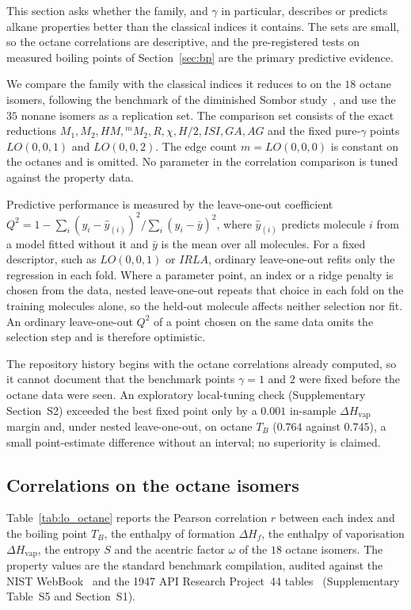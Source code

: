 \documentclass[a5paper, 10pt]{article}
\theoremstyle{plain}
\theoremstyle{remark}
\theoremstyle{definition}
\begin{document}
This section asks whether the family, and $\gamma$ in particular,
describes or predicts alkane properties better than the classical
indices it contains. The sets are small, so the octane
correlations are descriptive, and the pre-registered tests on measured
boiling points of Section~\ref{sec:bp} are the primary predictive
evidence.

We compare the family with the classical indices it reduces to on the
$18$ octane isomers, following the benchmark of the diminished Sombor
study~\cite{MovahediGutmanRedzepovicFurtula2026}, and use the $35$
nonane isomers as a replication set. The comparison set consists of
the exact reductions $M_1, M_2, HM, {}^{m}\!M_2, R, \chi, H/2, ISI, GA,
AG$ and the fixed pure-$\gamma$ points $LO(0, 0, 1)$ and $LO(0, 0, 2)$.
The edge count $m = LO(0, 0, 0)$ is constant on the octanes and is
omitted. No parameter in the correlation comparison is tuned against
the property data.

Predictive performance is measured by the leave-one-out coefficient
$Q^2 = 1 - \sum_i (y_i - \hat y_{(i)})^2 / \sum_i (y_i - \bar y)^2$,
where $\hat y_{(i)}$ predicts molecule $i$ from a model fitted without it
and $\bar y$ is the mean over all molecules. For a fixed descriptor, such
as $LO(0,0,1)$ or $IRLA$, ordinary leave-one-out refits only the
regression in each fold. Where a parameter point, an index or a ridge
penalty is chosen from the data, nested leave-one-out repeats that
choice in each fold on the training molecules alone, so the held-out
molecule affects neither selection nor fit. An ordinary leave-one-out
$Q^2$ of a point chosen on the same data omits the selection step and is
therefore optimistic.

The repository history begins with the octane correlations already
computed, so it cannot document that the benchmark points $\gamma = 1$ and
$2$ were fixed before the octane data were seen. An exploratory local-tuning check (Supplementary
Section~S2) exceeded the best fixed point only by a $0.001$ in-sample $\Delta H_{\mathrm{vap}}$ margin and, under nested leave-one-out, on octane $T_B$ ($0.764$ against $0.745$), a small point-estimate difference without an interval; no superiority is claimed.

\subsection{Correlations on the octane isomers}\label{sec:octanes}

Table~\ref{tab:lo_octane} reports the Pearson correlation $r$ between
each index and the boiling point $T_B$, the enthalpy of formation
$\Delta H_f$, the enthalpy of vaporisation $\Delta H_{\mathrm{vap}}$, the
entropy $S$ and the acentric factor $\omega$ of the $18$ octane isomers.
The property values are the standard benchmark compilation, audited
against the NIST WebBook~\cite{NISTWebBook} and the 1947 API Research
Project~44 tables~\cite{APIProject44Circ461} (Supplementary Table~S5
and Section~S1).
\end{document}
